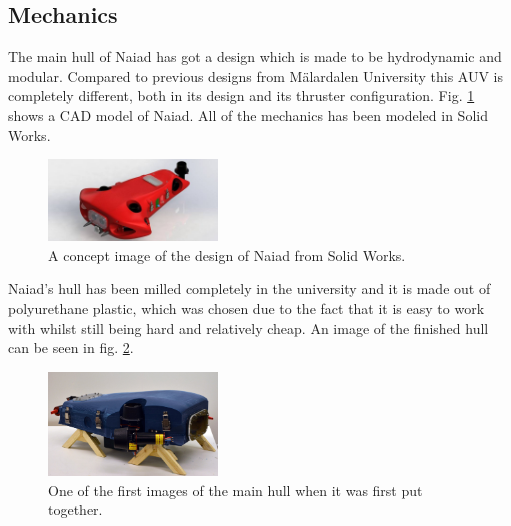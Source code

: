 \documentclass[twoside,12pt]{article}
\begin{document}
\begin{multicols*}{2}
\subsection{Mechanics}
The main hull of Naiad has got a design which is made to be hydrodynamic and modular. Compared to previous designs from M\"{a}lardalen University this AUV is completely different, both in its design and its thruster configuration. Fig. \ref{Naiad} shows a CAD model of Naiad. All of the mechanics has been modeled in Solid Works. 

\begin{figure}[H]
\begin{center}
\includegraphics[width=0.4\textwidth]{./images/concept.jpg}
\caption{A concept image of the design of Naiad from Solid Works.}
\label{Naiad}
\end{center}
\end{figure}

Naiad's hull has been milled completely in the university and it is made out of polyurethane plastic, which was chosen due to the fact that it is easy to work with whilst still being hard and relatively cheap. An image of the finished hull can be seen in fig. \ref{first}. 

\begin{figure}[H]
\begin{center}
\includegraphics[width=0.4\textwidth]{./images/first.jpg}
\caption{One of the first images of the main hull when it was first put together.}
\label{first}
\end{center}
\end{figure}


\end{multicols*}
\end{document}
